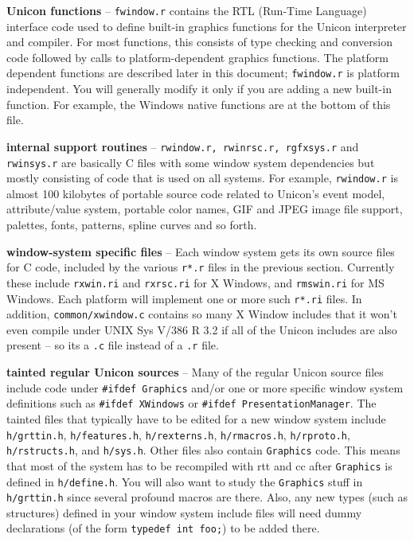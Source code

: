 \textbf{Unicon functions} -- \texttt{fwindow.r} contains the RTL
(Run-Time Language) interface code used to define built-in graphics
functions for the Unicon interpreter and compiler. For most functions,
this consists of type checking and conversion code followed by calls
to platform-dependent graphics functions. The platform dependent
functions are described later in this document; \texttt{fwindow.r} is
platform independent. You will generally modify it only if you are
adding a new built-in function. For example, the Windows native
functions are at the bottom of this file.

\textbf{internal support routines} -- \texttt{rwindow.r, rwinrsc.r,
rgfxsys.r} and \texttt{rwinsys.r} are basically C files with some
window system dependencies but mostly consisting of code that is used
on all systems. For example, \texttt{rwindow.r} is almost 100
kilobytes of portable source code related to Unicon's event model,
attribute/value system, portable color names, GIF and JPEG image file
support, palettes, fonts, patterns, spline curves and so forth.

\textbf{window-system specific files} -- Each window system gets its
own source files for C code, included by the various \texttt{r*.r}
files in the previous section. Currently these include
\texttt{rxwin.ri} and \texttt{rxrsc.ri} for X Windows, and
\texttt{rmswin.ri} for MS Windows. Each platform will implement
one or more such \texttt{r*.ri} files. In addition,
\texttt{common/xwindow.c} contains so many X Window includes that it
won't even compile under UNIX Sys V/386 R 3.2 if all of the Unicon
includes are also present -- so its a \texttt{.c} file instead of a
\texttt{.r} file.

\textbf{tainted {\textquotedbl}regular{\textquotedbl} Unicon sources}
-- Many of the regular Unicon source files include code under
\texttt{\#ifdef Graphics} and/or one or more specific window system
definitions such as \texttt{\#ifdef XWindows} or \texttt{\#ifdef
PresentationManager}. The tainted files that typically have to be
edited for a new window system include \texttt{h/grttin.h},
\texttt{h/features.h}, \texttt{h/rexterns.h}, \texttt{h/rmacros.h},
\texttt{h/rproto.h}, \texttt{h/rstructs.h}, and
\texttt{h/sys.h}. Other files also contain \texttt{Graphics}
code. This means that most of the system has to be recompiled with rtt
and cc after \texttt{Graphics} is defined in \texttt{h/define.h}. You
will also want to study the \texttt{Graphics} stuff in
\texttt{h/grttin.h} since several profound macros are there. Also, any
new types (such as structures) defined in your window system include
files will need dummy declarations (of the form \texttt{typedef int
foo;}) to be added there.


